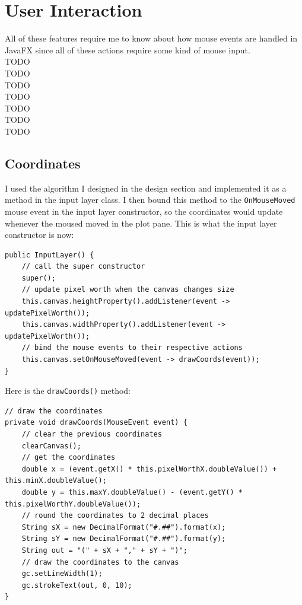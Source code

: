 \documentclass[../../../../main.tex]{subfiles}
\begin{document}
\section{User Interaction}
All of these features require me to know about how mouse events are handled in JavaFX since all of these actions require some kind of mouse input.\\
{\Large TODO}\\
{\Large TODO}\\
{\Large TODO}\\
{\Large TODO}\\
{\Large TODO}\\
{\Large TODO}\\
{\Large TODO}\\
\newpage
\subsection{Coordinates}
I used the algorithm I designed in the design section and implemented it as a method in the input layer class. I then bound this method to the \texttt{OnMouseMoved} mouse event in the input layer constructor, so the coordinates would update whenever the moused moved in the plot pane. This is what the input layer constructor is now:
\begin{verbatim}
public InputLayer() {
	// call the super constructor
	super();
	// update pixel worth when the canvas changes size
	this.canvas.heightProperty().addListener(event -> updatePixelWorth());
	this.canvas.widthProperty().addListener(event -> updatePixelWorth());
	// bind the mouse events to their respective actions
	this.canvas.setOnMouseMoved(event -> drawCoords(event));
}
\end{verbatim}
Here is the \texttt{drawCoords()} method:
\begin{verbatim}
// draw the coordinates
private void drawCoords(MouseEvent event) {
	// clear the previous coordinates
	clearCanvas();
	// get the coordinates
	double x = (event.getX() * this.pixelWorthX.doubleValue()) + this.minX.doubleValue();
	double y = this.maxY.doubleValue() - (event.getY() * this.pixelWorthY.doubleValue());
	// round the coordinates to 2 decimal places
	String sX = new DecimalFormat("#.##").format(x);
	String sY = new DecimalFormat("#.##").format(y);
	String out = "(" + sX + "," + sY + ")";
	// draw the coordinates to the canvas
	gc.setLineWidth(1);
	gc.strokeText(out, 0, 10);
}
\end{verbatim}
\end{document}
